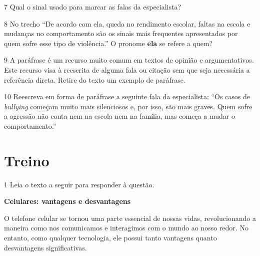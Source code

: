{

\num{7} Qual o sinal usado para marcar as falas da especialista? 


\num{8} No trecho ``De acordo com ela, queda no rendimento escolar, faltas na
escola e mudanças no comportamento são os sinais mais frequentes
apresentados por quem sofre esse tipo de violência.'' O pronome \textbf{ela} se
refere a quem?


\num{9} A paráfrase é um recurso muito comum em textos de opinião e
argumentativos. Este recurso visa à reescrita de alguma fala ou
citação sem que seja necessária a referência direta. Retire do texto
um exemplo de paráfrase.


\num{10} Reescreva em forma de paráfrase a seguinte fala da especialista: ``Os 
casos de \textit{bullying} começam muito mais silenciosos e, por isso, são mais graves. 
Quem sofre a agressão não conta nem na escola nem na família, mas começa a mudar 
o comportamento.''


\section{Treino}

\num{1} Leia o texto a seguir para responder à questão.

\begin{myquote}

\textbf{Celulares: vantagens e desvantagens}

O telefone celular se tornou uma parte essencial de nossas vidas,
revolucionando a maneira como nos comunicamos e interagimos com o mundo ao
nosso redor. No entanto, como qualquer tecnologia, ele possui tanto vantagens
quanto desvantagens significativas.


\end{myquote}}
